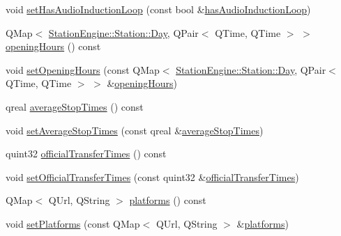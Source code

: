 \begin{DoxyCompactItemize}
void \mbox{\hyperlink{classQRail_1_1StationEngine_1_1Station_a2b37f24a1d97fbb77c0b41c44662e392}{set\+Has\+Audio\+Induction\+Loop}} (const bool \&\mbox{\hyperlink{classQRail_1_1StationEngine_1_1Station_a4f0fe605690b460d88064bd4d36fe1ea}{has\+Audio\+Induction\+Loop}})
\item 
Q\+Map$<$ \mbox{\hyperlink{classQRail_1_1StationEngine_1_1Station_ae8c109a1d5ce2bb41959e62e32392631}{Station\+Engine\+::\+Station\+::\+Day}}, Q\+Pair$<$ Q\+Time, Q\+Time $>$ $>$ \mbox{\hyperlink{classQRail_1_1StationEngine_1_1Station_a952190a3454e31982d35cc3afd7d7d34}{opening\+Hours}} () const
\item 
void \mbox{\hyperlink{classQRail_1_1StationEngine_1_1Station_a77c5ed806a41ad53afa4c03f96525bad}{set\+Opening\+Hours}} (const Q\+Map$<$ \mbox{\hyperlink{classQRail_1_1StationEngine_1_1Station_ae8c109a1d5ce2bb41959e62e32392631}{Station\+Engine\+::\+Station\+::\+Day}}, Q\+Pair$<$ Q\+Time, Q\+Time $>$ $>$ \&\mbox{\hyperlink{classQRail_1_1StationEngine_1_1Station_a952190a3454e31982d35cc3afd7d7d34}{opening\+Hours}})
\item 
qreal \mbox{\hyperlink{classQRail_1_1StationEngine_1_1Station_a4747748868a77baad4dd01daac657fcf}{average\+Stop\+Times}} () const
\item 
void \mbox{\hyperlink{classQRail_1_1StationEngine_1_1Station_a18cdb01a71d2b17cbfdcc2a67a028a8a}{set\+Average\+Stop\+Times}} (const qreal \&\mbox{\hyperlink{classQRail_1_1StationEngine_1_1Station_a4747748868a77baad4dd01daac657fcf}{average\+Stop\+Times}})
\item 
quint32 \mbox{\hyperlink{classQRail_1_1StationEngine_1_1Station_ad58620e2c5bf189e819165464d456d61}{official\+Transfer\+Times}} () const
\item 
void \mbox{\hyperlink{classQRail_1_1StationEngine_1_1Station_a1182f0a0ab0c0d3a168bb72389d108cb}{set\+Official\+Transfer\+Times}} (const quint32 \&\mbox{\hyperlink{classQRail_1_1StationEngine_1_1Station_ad58620e2c5bf189e819165464d456d61}{official\+Transfer\+Times}})
\item 
Q\+Map$<$ Q\+Url, Q\+String $>$ \mbox{\hyperlink{classQRail_1_1StationEngine_1_1Station_abc2d6647137da855d877a7061a261bc8}{platforms}} () const
\item 
void \mbox{\hyperlink{classQRail_1_1StationEngine_1_1Station_ab275347465eb810b7c8f2a6e1802feb4}{set\+Platforms}} (const Q\+Map$<$ Q\+Url, Q\+String $>$ \&\mbox{\hyperlink{classQRail_1_1StationEngine_1_1Station_abc2d6647137da855d877a7061a261bc8}{platforms}})
\end{DoxyCompactItemize}


